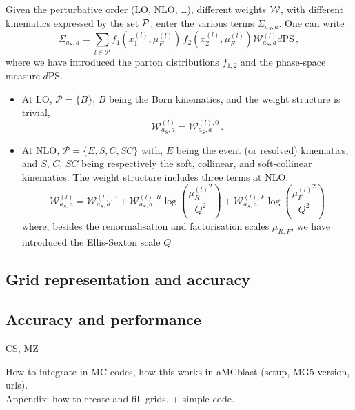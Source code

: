 Given the perturbative order (LO, NLO, \ldots), different weights $\cal W$, with different kinematics expressed by the set $\cal P$, enter the various
terms $\Sigma_{a_S, a}$. One can write
\begin{equation}
    \Sigma_{a_S, a}= \sum_{l\in \mathcal P} f_1(x_1^{(l)},\mu_F^{(l)}) \,f_2(x_2^{(l)},\mu_F^{(l)}) \mathcal W^{(l)}_{a_S, a}
    d \textrm{PS}\,,
\end{equation}
where we have introduced the parton distributions $f_{1,2}$ and the phase-space measure $d$PS.
\begin{itemize}
    \item At LO, $\mathcal P = \{B\}$, $B$ being the Born kinematics, and the weight structure is trivial,
    \begin{equation}
        \mathcal W^{(l)}_{a_S, a} = {\mathcal W^{(l),0}_{a_S, a}}\,.
    \end{equation}
    \item At NLO, $\mathcal P = \{E, S, C, SC\}$ with, $E$ being the event (or resolved) kinematics, and $S$, $C$, $SC$ being
        respectively the soft, collinear, and soft-collinear kinematics. The weight structure includes three terms at NLO:
    \begin{equation}
        \mathcal W^{(l)}_{a_S, a} = {{\mathcal W}^{(l),0}_{a_S, a}} +
                                {\mathcal W^{(l),R}_{a_S, a}} \log\left(\frac{{\mu_R^{(l)}}^2}{Q^2}\right) +
                                {\mathcal W^{(l),F}_{a_S, a}} \log\left(\frac{{\mu_F^{(l)}}^2}{Q^2}\right)
    \end{equation}
    where, besides the renormalisation and factorisation scales $\mu_{R,F}$, we have introduced the Ellis-Sexton scale $Q$
\end{itemize}

\subsection{Grid representation and accuracy}
\label{sec:grid-representation}

\subsection{Accuracy and performance}
\label{sec:accuracy-and-performance}

CS, MZ

How to integrate in MC codes, how this works in aMCblast (setup, MG5 version, urls).\\
Appendix: how to create and fill grids, + simple code.
